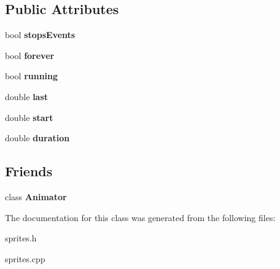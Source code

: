 \subsection*{Public Attributes}
\begin{DoxyCompactItemize}
\item 
\hypertarget{classg2c_1_1_animation_a20456d5d6aaefb4269661ab75475d48f}{
bool {\bfseries stopsEvents}}
\label{classg2c_1_1_animation_a20456d5d6aaefb4269661ab75475d48f}

\item 
\hypertarget{classg2c_1_1_animation_ae31ea2ad940df528e825ab11e9aa7398}{
bool {\bfseries forever}}
\label{classg2c_1_1_animation_ae31ea2ad940df528e825ab11e9aa7398}

\item 
\hypertarget{classg2c_1_1_animation_a84cfa640fd167aa91352787d10b4542e}{
bool {\bfseries running}}
\label{classg2c_1_1_animation_a84cfa640fd167aa91352787d10b4542e}

\item 
\hypertarget{classg2c_1_1_animation_a67aeb7b956f81a36d2f0d0d99034fdfe}{
double {\bfseries last}}
\label{classg2c_1_1_animation_a67aeb7b956f81a36d2f0d0d99034fdfe}

\item 
\hypertarget{classg2c_1_1_animation_a61b12f0405fbf1891c4c3e0fb14f2657}{
double {\bfseries start}}
\label{classg2c_1_1_animation_a61b12f0405fbf1891c4c3e0fb14f2657}

\item 
\hypertarget{classg2c_1_1_animation_a5c932c7485a503f9d261633ab11c211a}{
double {\bfseries duration}}
\label{classg2c_1_1_animation_a5c932c7485a503f9d261633ab11c211a}

\end{DoxyCompactItemize}
\subsection*{Friends}
\begin{DoxyCompactItemize}
\item 
\hypertarget{classg2c_1_1_animation_abbbfe7b916ef7239a2e95fdb21d0211f}{
class {\bfseries Animator}}
\label{classg2c_1_1_animation_abbbfe7b916ef7239a2e95fdb21d0211f}

\end{DoxyCompactItemize}


The documentation for this class was generated from the following files:\begin{DoxyCompactItemize}
\item 
sprites.h\item 
sprites.cpp\end{DoxyCompactItemize}
